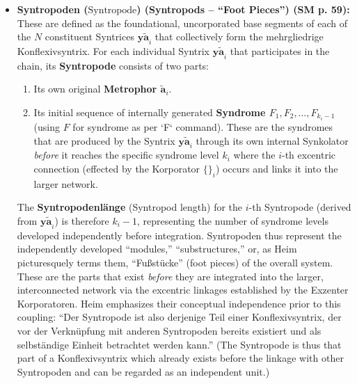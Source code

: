 \documentclass[12pt]{article}
\newcommand{\q}[1]{\enquote{#1}}
\newcommand{\syntrix}{\bm{y\widetilde{a}}}
\newcommand{\metrophor}{\bm{\widetilde{a}}}
\newcommand{\syndrom}{F}
\newcommand{\syntropode}{\text{Syntropode}}
\begin{document}
\begin{itemize}
    \item \textbf{Syntropoden (\(\syntropode\)) (Syntropods – \q{Foot Pieces}) (SM p. 59):}
    These are defined as the foundational, uncorporated base segments of each of the \( N \) constituent Syntrices \( \syntrix_i \) that collectively form the mehrgliedrige Konflexivsyntrix. For each individual Syntrix \( \syntrix_i \) that participates in the chain, its \textbf{Syntropode} consists of two parts:
    \begin{enumerate}
        \item Its own original \textbf{Metrophor \( \metrophor_i \)}.
        \item Its initial sequence of internally generated \textbf{Syndrome \( \syndrom_1, \syndrom_2, \dots, \syndrom_{k_i-1} \)} (using \(F\) for syndrome as per `\syndrom` command). These are the syndromes that are produced by the Syntrix \( \syntrix_i \) through its own internal Synkolator \textit{before} it reaches the specific syndrome level \( k_i \) where the \( i \)-th excentric connection (effected by the Korporator \( \{ \}_i \)) occurs and links it into the larger network.
    \end{enumerate}
    The \textbf{Syntropodenlänge} (Syntropod length) for the \(i\)-th Syntropode (derived from \( \syntrix_i \)) is therefore \( k_i - 1 \), representing the number of syndrome levels developed independently before integration. Syntropoden thus represent the independently developed \q{modules,} \q{substructures,} or, as Heim picturesquely terms them, \q{Fußstücke} (foot pieces) of the overall system. These are the parts that exist \textit{before} they are integrated into the larger, interconnected network via the excentric linkages established by the Exzenter Korporatoren. Heim emphasizes their conceptual independence prior to this coupling: \q{Der Syntropode ist also derjenige Teil einer Konflexivsyntrix, der vor der Verknüpfung mit anderen Syntropoden bereits existiert und als selbständige Einheit betrachtet werden kann.} (The Syntropode is thus that part of a Konflexivsyntrix which already exists before the linkage with other Syntropoden and can be regarded as an independent unit.)


\end{itemize}
\end{document}
